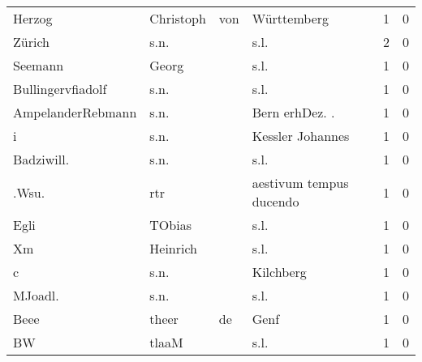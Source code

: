 \begin{tabular}{llllrr}
                   Herzog &                          Christoph &         von &                                 Württemberg &          1 &         0 \\
                   Zürich &                               s.n. &             &                                        s.l. &          2 &         0 \\
                  Seemann &                              Georg &             &                                        s.l. &          1 &         0 \\
        Bullingervfiadolf &                               s.n. &             &                                        s.l. &          1 &         0 \\
        AmpelanderRebmann &                               s.n. &             &                             Bern erhDez. .  &          1 &         0 \\
                        i &                               s.n. &             &                            Kessler Johannes &          1 &         0 \\
               Badziwill. &                               s.n. &             &                                        s.l. &          1 &         0 \\
                    .Wsu. &                                rtr &             &                     aestivum tempus ducendo &          1 &         0 \\
                     Egli &                             TObias &             &                                        s.l. &          1 &         0 \\
                       Xm &                           Heinrich &             &                                        s.l. &          1 &         0 \\
                        c &                               s.n. &             &                                   Kilchberg &          1 &         0 \\
                  MJoadl. &                               s.n. &             &                                        s.l. &          1 &         0 \\
                     Beee &                              theer &          de &                                        Genf &          1 &         0 \\
                       BW &                              tlaaM &             &                                        s.l. &          1 &         0 \\

\end{tabular}
